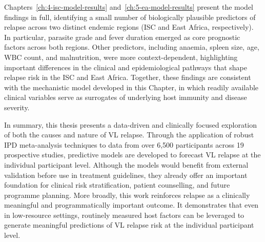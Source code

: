 Chapters~\ref{ch:4-isc-model-results} and~\ref{ch:5-ea-model-results} present the model findings in full, identifying a small number of biologically plausible predictors of relapse across two distinct endemic regions (ISC and East Africa, respectively). In particular, parasite grade and fever duration emerged as core prognostic factors across both regions. Other predictors, including anaemia, spleen size, age, WBC count, and malnutrition, were more context-dependent, highlighting important differences in the clinical and epidemiological pathways that shape relapse risk in the ISC and East Africa. Together, these findings are consistent with the mechanistic model developed in this Chapter, in which readily available clinical variables serve as surrogates of underlying host immunity and disease severity.

In summary, this thesis presents a data-driven and clinically focused exploration of both the causes and nature of VL relapse. Through the application of robust IPD meta-analysis techniques to data from over 6,500 participants across 19 prospective studies, predictive models are developed to forecast VL relapse at the individual participant level. Although the models would benefit from external validation before use in treatment guidelines, they already offer an important foundation for clinical risk stratification, patient counselling, and future programme planning. More broadly, this work reinforces relapse as a clinically meaningful and programmatically important outcome. It demonstrates that even in low-resource settings, routinely measured host factors can be leveraged to generate meaningful predictions of VL relapse risk at the individual participant level.